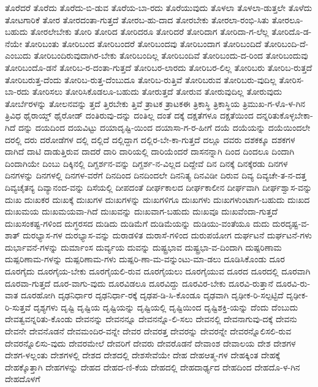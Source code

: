 {ತೊರೆದರೆ
ತೊರೆದು
ತೊರೆದು-ಬಿ-ಡುವ
ತೊರೆಯ-ಬಾ-ರದು
ತೊರೆಯುವುದು
ತೊಳಲಾ
ತೊಳಲಾ-ಡುತ್ತಲೇ
ತೊಳೆದು
ತೋಟಗಾರಿಕೆ
ತೋರ
ತೋರದಂತಾ-ಗುತ್ತದೆ
ತೋರಬ-ಹು-ದಾದ
ತೋರಬೇಕು
ತೋರಲಾ-ರಂಭಿ-ಸಿತು
ತೋರಲೂ-ಬಹುದು
ತೋರಲೇಬೇಕು
ತೋರಿ
ತೋರಿದ
ತೋರಿದರೂ
ತೋರಿದರೆ
ತೋರಿದಾಗ
ತೋರಿದಾ-ಗ-ಲೆಲ್ಲ
ತೋರಿದೊ-ಡ-ನೆಯೇ
ತೋರಿಬಂತು
ತೋರಿಬಂದ
ತೋರಿಬಂದರೆ
ತೋರಿಬಂದವು
ತೋರಿಬಂದಾಗ
ತೋರಿಬಂದಿದೆ
ತೋರಿಬಂದಿ-ದೆ-ಎಂಬುದು
ತೋರಿಬಂದಿರುವುದಾಗಿರ-ಬೇಕು
ತೋರಿಬಂದಿಲ್ಲ
ತೋರಿಬಂದಿವೆ
ತೋರಿಬಂದು-ದ-ರಿಂದ
ತೋರಿಬಂದುವು
ತೋರಿಬಂದೊ-ಡನೆ
ತೋರಿಬ-ರ-ದಂತಾ-ಗುತ್ತದೆ
ತೋರಿಬರ-ಲಾರದು
ತೋರಿಬರ-ಲಿಲ್ಲ
ತೋರಿಬರು
ತೋರಿಬ-ರುತ್ತದೆ
ತೋರಿಬರುತ್ತ-ದೆಂದು
ತೋರಿಬ-ರುತ್ತ-ದೆಂಬುದೂ
ತೋರಿಬ-ರುತ್ತಿವೆ
ತೋರಿಬರುವ
ತೋರಿಬರು-ವುದಿಲ್ಲ
ತೋರಿಸ-ಬಾ-ರದು
ತೋರಿಸಲು
ತೋರಿಸಿಕೊಡಲೂ-ಬಹುದು
ತೋರುತ್ತದೆ
ತೋರುವ
ತೋರುವುದಿಲ್ಲ
ತೋರುವುದು
ತೋರ್ಬೆರಳನ್ನು
ತೋಲನವನ್ನು
ತ್ತದೆ
ತ್ತಿರಬೇಕು
ತ್ತಿವೆ
ತ್ರಾಟಕ
ತ್ರಾಟಕಈ
ತ್ರಿಕಾಸ್ಥಿ
ತ್ರಿಕಾಸ್ಥಿಯ
ತ್ರಿಮುಖ-ಗ-ಳೊ-ಳ-ಗಿನ
ತ್ರಿವಿಧ
ಥೈರಾಯ್ಡ್
ಥೈರೋಡ್
ದಂತಿರುವು-ದನ್ನು
ದಂತಿಲ್ಲ
ದಂತೆ
ದಕ್ಕೆ
ದಕ್ಷತೆಗಳೂ
ದಕ್ಷತೆಯಿಂದ
ದನ್ನರಿತುಕೊಳ್ಳಬೇಕಾ-ಗಿದೆ
ದನ್ನು
ದಯದಿಂದ
ದಯವಿಟ್ಟು
ದಯಾದೃಷ್ಟಿ-ಯಿಂದ
ದಯಾಸಾ-ಗ-ರ-ಹೀಗೆ
ದಯೆ
ದಯೆಯನ್ನು
ದಯೆಯಿಂದಲೇ
ದರಲ್ಲಿ
ದರು
ದರೋಡೆಗಳ
ದಲ್ಲಿ
ದಲ್ಲಿದೆ
ದಲ್ಲಿದ್ದಾಗ
ದಲ್ಲಿರ-ಬೇ-ಕಾ-ಗುತ್ತದೆ
ದಲ್ಲೂ
ದವರು
ದಶಕಕ್ಕೂ
ದಶಕಗಳ
ದಾಗಿದೆ
ದಾಟಿ
ದಾಡುತ್ತಿರುವ
ದಾದರೆ
ದಾರಿ
ದಾರಿಯಲ್ಲಿ
ದಾರಿಯೆಂದರೆ
ದಾಸನನ್ನಾಗಿ
ದಿಂದ
ದಿಂದಲೂ
ದಿಂದಾಗಿ
ದಿಂದಾಗಿಯೇ
ದಿಂಬು
ದಿಕ್ಕಿನಲ್ಲಿ
ದಿಗ್ದರ್ಶನ-ವನ್ನು
ದಿಗ್ದರ್ಶ-ನ-ವಿಲ್ಲದ
ದಿದ್ದೇವೆ
ದಿನ
ದಿನಕ್ಕೆ
ದಿನಕ್ಕೆರಡು
ದಿನಗಳ
ದಿನಗಳನ್ನು
ದಿನಗಳಲ್ಲಿ
ದಿನಗಳ-ವರೆಗೆ
ದಿನದಿಂದ
ದಿನದಿಂದಲೇ
ದಿನನಿತ್ಯ
ದಿನವಿಡೀ
ದಿರುವ
ದಿವ್ಯ
ದಿವ್ಯಚೇ-ತ-ನ-ದತ್ತ
ದಿವ್ಯಚೈತನ್ಯ
ದಿವ್ಯಾನಂದ-ವನ್ನು
ದಿಸೆಯಲ್ಲಿ
ದೀಪದಂತೆ
ದೀರ್ಘಕಾಲದ
ದೀರ್ಘಕಾಲೀನ
ದೀರ್ಘವಾಗಿ
ದೀರ್ಘಶ್ವಾಸ-ವನ್ನು
ದುಃಖ
ದುಃಖಕರ
ದುಃಖಕ್ಕೆ
ದುಃಖಗಳ
ದುಃಖಗಳನ್ನು
ದುಃಖಗಳಿಗೂ
ದುಃಖಗಳು
ದುಃಖಗಳುಂಟಾಗ-ಬಹುದು
ದುಃಖದ
ದುಃಖಮಯ
ದುಃಖಮಯವಾ-ಗಿದೆ
ದುಃಖವನ್ನು
ದುಃಖವಾಗ-ಬಹುದು
ದುಃಖವೂ
ದುಃಖವೆಂದಾ-ಗುತ್ತದೆ
ದುಃಖಸಂಕಷ್ಟ-ಗಳಿಂದ
ದುಗ್ಧರಸದ
ದುಡಿದು
ದುಡಿಮೆಗೆ
ದುಡಿಮೆಯನ್ನು
ದುಡಿಯು-ವಂತೆಯೂ
ದುದು
ದುರದೃಷ್ಟ-ವ-ಶಾತ್
ದುರಭ್ಯಾಸ-ಗಳ
ದುರಭ್ಯಾಸ-ವನ್ನು
ದುರಾಡಳಿತ
ದುರಾಸೆ-ಗಳಿಂದ
ದುರುಪಯೋಗ
ದುರ್ಘಟನೆ
ದುರ್ಘಟನೆ-ಗಳು
ದುರ್ಭಾವನೆ-ಗಳನ್ನು
ದುರ್ಮಾಂಸ
ದುರ್ವ್ಯಯ
ದುವನ್ನು
ದುಷ್ಟ್ರಭಾವ
ದುಷ್ಟ್ರಭಾ-ವ-ದಿಂದಾಗಿ
ದುಷ್ಪರಿಣಾಮ
ದುಷ್ಪರಿಣಾಮ-ಗಳನ್ನು
ದುಷ್ಪರಿಣಾಮ-ಗಳು
ದುಷ್ಪರಿ-ಣಾ-ಮ-ವನ್ನುಂಟು-ಮಾ-ಡಲು
ದೂಡಿಸಿಕೊಂಡು
ದೂರ
ದೂರಗೈದು
ದೂರಗೈಯ-ಬೇಕು
ದೂರಗೈಯಲಿ-ರುವ
ದೂರಗೈಯಲು
ದೂರಗೈಯುವ
ದೂರದ
ದೂರದಲ್ಲಿ
ದೂರವಾಗಿ
ದೂರವಾ-ಗುತ್ತದೆ
ದೂರ-ವಾಗು-ವುದು
ದೂರವಿಡಲೂ
ದೂರವಿದ್ದು
ದೂರವಿರ-ಬೇಕು
ದೂರವಿ-ರುತ್ತಾನೆ
ದೂರವಿ-ರು-ವಾತ
ದೂರಹೋಗಿ
ದೃಢನಿರ್ಧಾರ
ದೃಢನಿರ್ಧಾ-ರಕ್ಕೆ
ದೃಢಪ-ಡಿ-ಸಿ-ಕೊಂಡೂ
ದೃಢವಾಗಿ
ದೃಢೀಕ-ರಿ-ಸಲ್ಪಟ್ಟಿದೆ
ದೃಢೀಕ-ರಿ-ಸುತ್ತವೆ
ದೃಶ್ಯಗಳು
ದೃಷ್ಟಿ
ದೃಷ್ಟಿಯ
ದೃಷ್ಟಿಯನ್ನು
ದೃಷ್ಟಿಯಲ್ಲಿ
ದೃಷ್ಟಿಯಿಂದ
ದೃಷ್ಟಿಶಕ್ತಿ-ಯನ್ನು
ದೆಂದು
ದೆಂಬುದು
ದೇವತ್ವವನ್ನರಿತು-ಕೊಂಡು
ದೇವನನ್ನು
ದೇವನನ್ನೂ
ದೇವನನ್ನೊ-ಲಿ-ಸಲು
ದೇವನಲ್ಲಿ
ದೇವನಾಗುವು-ದಕ್ಕೆ
ದೇವನು
ದೇವನೇ
ದೇವನೊಡನೆ
ದೇವಮಂದಿರ-ವನ್ನೇ
ದೇವರ
ದೇವರತ್ತ
ದೇವರನ್ನು
ದೇವರನ್ನೇ
ದೇವರನ್ನೊಲಿಸಲಿ-ರುವ
ದೇವರನ್ನೊಲಿಸು-ವುದು
ದೇವರಮೇಲೆ
ದೇವರಿಗೆ
ದೇವರು
ದೇವರೊಡನೆ
ದೇವಾಂಶ
ದೇವಾಲಯ
ದೇಶ
ದೇಶಗಳ
ದೇಶಗ-ಳಲ್ಲಂತು
ದೇಶಗಳಲ್ಲಿ
ದೇಶದ
ದೇಶದಲ್ಲಿ
ದೇಶಸೇವೆಯೇ
ದೇಹ
ದೇಹಆತ್ಮ-ಗಳ
ದೇಹಕ್ಕಿಂತ
ದೇಹಕ್ಕೆ
ದೇಹಕ್ಕೊತ್ತಾಗಿ
ದೇಹಗಳನ್ನು
ದೇಹದ
ದೇಹದ-ಣಿ-ಕೆಯ
ದೇಹದಲ್ಲಿ
ದೇಹದಾರ್ಢ್ಯದ
ದೇಹದಿಂದ
ದೇಹದೊ-ಳ-ಗಿನ
ದೇಹದೊಳಗೆ
}
